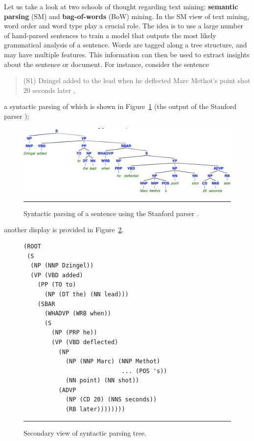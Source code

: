 \newl Let us take a look at two schools of thought regarding text mining: \textbf{semantic parsing} (SM) and \textbf{bag-of-words} (BoW) mining. \newpage\noindent In the SM view of text mining, word order and word type play a crucial role. The idea is to use a large number of hand-parsed sentences to train a model that outputs the most likely grammatical analysis of a sentence. Words are tagged along a tree structure, and may have multiple features. This information can then be used to extract insights about the sentence or document. \newl For instance, consider the sentence \begin{quote}(S1) Dzingel added to the lead when he deflected Marc Methot's point shot 20 seconds later \cite{TM_OTT_TOR},\end{quote} a syntactic parsing of which is shown in Figure~\ref{fig:sent_pars2} (the output of the Stanford parser \cite{TM_SP}); \begin{figure}[!t]\centering\includegraphics[width=\textwidth]{images/DSML/TMSemanticParsing.png}\caption[\small Syntactic parsing tree]{\small Syntactic parsing of a sentence using the Stanford parser \cite{TM_SP}.}\hrule\label{fig:sent_pars2}\end{figure} another display is provided in Figure~\ref{fig:tree2}.
\begin{figure}[!t]
\centering\footnotesize \begin{verbatim}
(ROOT
 (S
  (NP (NNP Dzingel))
  (VP (VBD added)
    (PP (TO to)
      (NP (DT the) (NN lead)))
    (SBAR
      (WHADVP (WRB when))
      (S
        (NP (PRP he))
        (VP (VBD deflected)
          (NP
            (NP (NNP Marc) (NNP Methot)
                            ... (POS 's))
            (NN point) (NN shot))
          (ADVP
            (NP (CD 20) (NNS seconds))
            (RB later))))))))
\end{verbatim}
\normalsize
\caption[\small Secondary view of syntactic parsing]{\small Secondary view of syntactic parsing tree.}\hrule\label{fig:tree2}
\end{figure}
